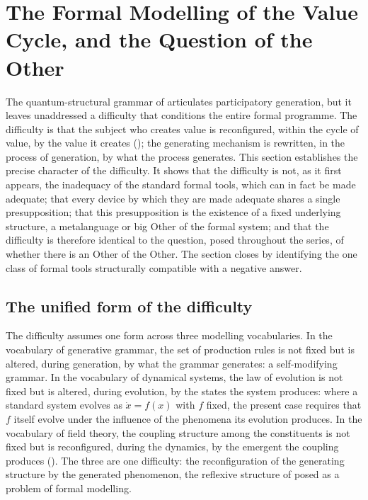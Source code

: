 \section{The Formal Modelling of the Value Cycle, and the Question of the Other}
\label{p10:sec:modelling}

\noindent
The quantum-structural grammar of  articulates participatory generation, but it leaves unaddressed a difficulty that conditions the entire formal programme. The difficulty is that the subject who creates value is reconfigured, within the cycle of value, by the value it creates (); the generating mechanism is rewritten, in the process of generation, by what the process generates. This section establishes the precise character of the difficulty. It shows that the difficulty is not, as it first appears, the inadequacy of the standard formal tools, which can in fact be made adequate; that every device by which they are made adequate shares a single presupposition; that this presupposition is the existence of a fixed underlying structure, a metalanguage or big Other of the formal system; and that the difficulty is therefore identical to the question, posed throughout the series, of whether there is an Other of the Other. The section closes by identifying the one class of formal tools structurally compatible with a negative answer.

\subsection{The unified form of the difficulty}
\label{p10:sec:mod-form}

The difficulty assumes one form across three modelling vocabularies. In the vocabulary of generative grammar, the set of production rules is not fixed but is altered, during generation, by what the grammar generates: a self-modifying grammar. In the vocabulary of dynamical systems, the law of evolution is not fixed but is altered, during evolution, by the states the system produces: where a standard system evolves as $\dot{x} = f(x)$ with $f$ fixed, the present case requires that $f$ itself evolve under the influence of the phenomena its evolution produces. In the vocabulary of field theory, the coupling structure among the constituents is not fixed but is reconfigured, during the dynamics, by the emergent the coupling produces (). The three are one difficulty: the reconfiguration of the generating structure by the generated phenomenon, the reflexive structure of  posed as a problem of formal modelling.

